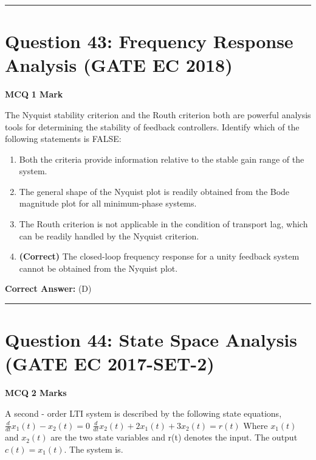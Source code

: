 \documentclass[11pt,a4paper]{article}
\begin{document}
\vspace{1.5em}
\hrule
\vspace{1.5em}

\section*{Question 43: Frequency Response Analysis (GATE EC 2018)}
\noindent \textbf{\color{primary}MCQ} \hfill \textbf{\color{secondary}1 Mark}


\noindent The Nyquist stability criterion and the Routh criterion both are powerful analysis tools for
determining the stability of feedback controllers. Identify which of the following statements
is FALSE:


\begin{enumerate}[label=(\Alph*)]
    \item Both the criteria provide information relative to the stable gain range of the system.
    \item The general shape of the Nyquist plot is readily obtained from the Bode magnitude plot
for all minimum-phase systems.
    \item The Routh criterion is not applicable in the condition of transport lag, which can be
readily handled by the Nyquist criterion.
    \item \textbf{(Correct)} The closed-loop frequency response for a unity feedback system cannot be obtained
from the Nyquist plot.
\end{enumerate}

\noindent \textbf{Correct Answer:} (D)


\vspace{1.5em}
\hrule
\vspace{1.5em}

\section*{Question 44: State Space Analysis (GATE EC 2017-SET-2)}
\noindent \textbf{\color{primary}MCQ} \hfill \textbf{\color{secondary}2 Marks}


\noindent A second - order LTI system is described by the following state equations, 
 $\frac{d}{dt}x_{1}(t)- x_{2}(t)=0$   
        $\frac{d}{dt}x_{2}(t)+2x_{1}(t)+3x_{2}(t)=r(t)$    
     Where $x_{1}(t)$ and  $x_{2}(t)$ are the two state variables and r(t) denotes the input. The output  $c(t) =x_{1}(t)$. The system is.
\end{document}
